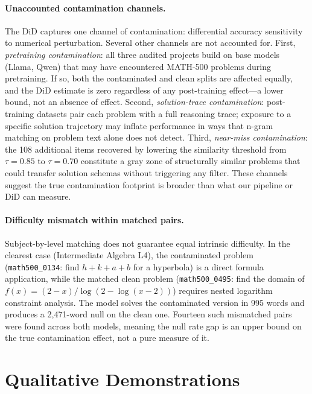 \documentclass{article} %
\begin{document}
\paragraph{Unaccounted contamination channels.}
The DiD captures one channel of contamination: differential accuracy sensitivity to numerical perturbation. Several other channels are not accounted for. First, \emph{pretraining contamination}: all three audited projects build on base models (Llama, Qwen) that may have encountered MATH-500 problems during pretraining. If so, both the contaminated and clean splits are affected equally, and the DiD estimate is zero regardless of any post-training effect---a lower bound, not an absence of effect. Second, \emph{solution-trace contamination}: post-training datasets pair each problem with a full reasoning trace; exposure to a specific solution trajectory may inflate performance in ways that n-gram matching on problem text alone does not detect. Third, \emph{near-miss contamination}: the 108 additional items recovered by lowering the similarity threshold from $\tau{=}0.85$ to $\tau{=}0.70$ constitute a gray zone of structurally similar problems that could transfer solution schemas without triggering any filter. These channels suggest the true contamination footprint is broader than what our pipeline or DiD can measure.

\paragraph{Difficulty mismatch within matched pairs.}
Subject-by-level matching does not guarantee equal intrinsic difficulty. In the clearest case (Intermediate Algebra L4), the contaminated problem (\texttt{math500\_0134}: find $h{+}k{+}a{+}b$ for a hyperbola) is a direct formula application, while the matched clean problem (\texttt{math500\_0495}: find the domain of $f(x){=}(2{-}x)/\log(2{-}\log(x{-}2))$) requires nested logarithm constraint analysis. The model solves the contaminated version in 995 words and produces a 2,471-word null on the clean one. Fourteen such mismatched pairs were found across both models, meaning the null rate gap is an upper bound on the true contamination effect, not a pure measure of it.

\section{Qualitative Demonstrations}
\end{document}
